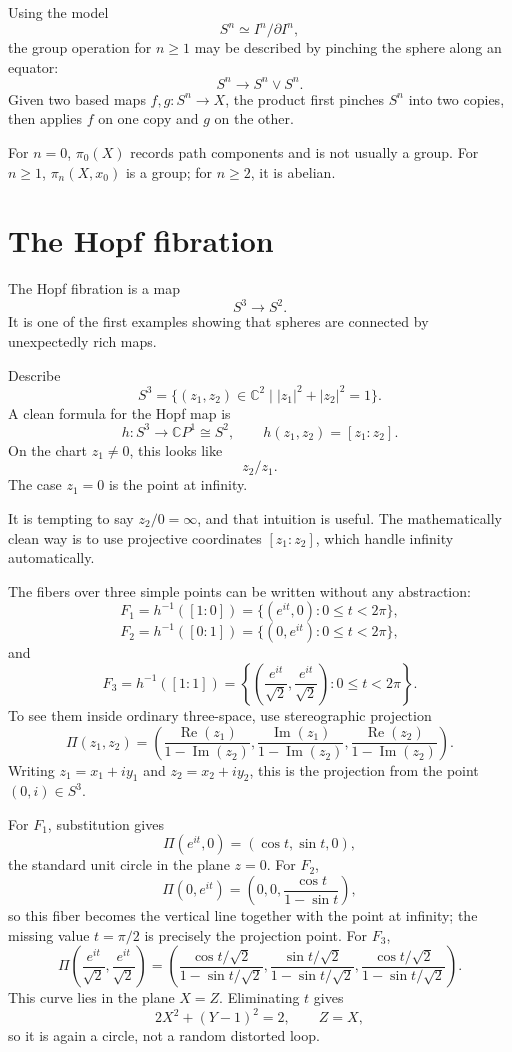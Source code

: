 Using the model
\[
  S^n\simeq I^n/\partial I^n,
\]
the group operation for \(n\ge1\) may be described by pinching the sphere along an equator:
\[
  S^n\to S^n\vee S^n.
\]
Given two based maps \(f,g:S^n\to X\), the product first pinches \(S^n\) into two copies, then applies \(f\) on one copy and \(g\) on the other.

\begin{remark}
For \(n=0\), \(\pi_0(X)\) records path components and is not usually a group.  For \(n\ge1\), \(\pi_n(X,x_0)\) is a group; for \(n\ge2\), it is abelian.
\end{remark}

\section{The Hopf fibration}

The Hopf fibration is a map
\[
  S^3\to S^2.
\]
It is one of the first examples showing that spheres are connected by unexpectedly rich maps.

Describe
\[
  S^3=\{(z_1,z_2)\in\mathbb C^2\mid |z_1|^2+|z_2|^2=1\}.
\]
A clean formula for the Hopf map is
\[
  h:S^3\to\mathbb CP^1\cong S^2,\qquad h(z_1,z_2)=[z_1:z_2].
\]
On the chart \(z_1\neq0\), this looks like
\[
  z_2/z_1.
\]
The case \(z_1=0\) is the point at infinity.

\begin{caution}
It is tempting to say \(z_2/0=\infty\), and that intuition is useful.  The mathematically clean way is to use projective coordinates \([z_1:z_2]\), which handle infinity automatically.
\end{caution}

The fibers over three simple points can be written without any abstraction:
\[
  F_1=h^{-1}([1:0])
  =\{(e^{it},0):0\le t<2\pi\},
\]
\[
  F_2=h^{-1}([0:1])
  =\{(0,e^{it}):0\le t<2\pi\},
\]
and
\[
  F_3=h^{-1}([1:1])
  =
  \left\{\left(\frac{e^{it}}{\sqrt2},\frac{e^{it}}{\sqrt2}\right):0\le t<2\pi\right\}.
\]
To see them inside ordinary three-space, use stereographic projection
\[
  \Pi(z_1,z_2)=
  \left(
  \frac{\operatorname{Re}(z_1)}{1-\operatorname{Im}(z_2)},
  \frac{\operatorname{Im}(z_1)}{1-\operatorname{Im}(z_2)},
  \frac{\operatorname{Re}(z_2)}{1-\operatorname{Im}(z_2)}
  \right).
\]
Writing \(z_1=x_1+iy_1\) and \(z_2=x_2+iy_2\), this is the projection from the point \((0,i)\in S^3\).

For \(F_1\), substitution gives
\[
  \Pi(e^{it},0)=(\cos t,\sin t,0),
\]
the standard unit circle in the plane \(z=0\).  For \(F_2\),
\[
  \Pi(0,e^{it})
  =
  \left(0,0,\frac{\cos t}{1-\sin t}\right),
\]
so this fiber becomes the vertical line together with the point at infinity; the missing value \(t=\pi/2\) is precisely the projection point.  For \(F_3\),
\[
  \Pi\left(\frac{e^{it}}{\sqrt2},\frac{e^{it}}{\sqrt2}\right)
  =
  \left(
  \frac{\cos t/\sqrt2}{1-\sin t/\sqrt2},
  \frac{\sin t/\sqrt2}{1-\sin t/\sqrt2},
  \frac{\cos t/\sqrt2}{1-\sin t/\sqrt2}
  \right).
\]
This curve lies in the plane \(X=Z\).  Eliminating \(t\) gives
\[
  2X^2+(Y-1)^2=2,
  \qquad Z=X,
\]
so it is again a circle, not a random distorted loop.

